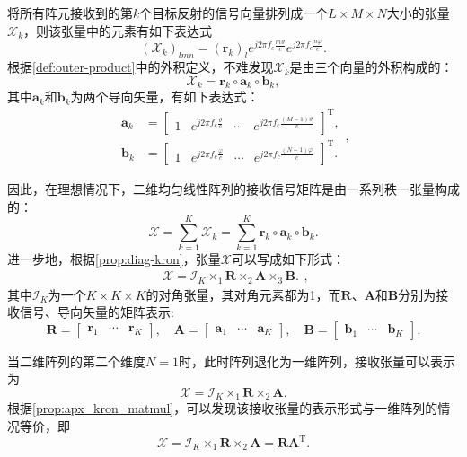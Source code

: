 将所有阵元接收到的第\( k \)个目标反射的信号向量排列成一个\( L \times M \times N \)大小的张量\( \mathcal{X}_k \)，则该张量中的元素有如下表达式
\[
    \left( \mathcal{X}_k \right)_{lmn} = \left( \bm{r}_k \right)_l e^{j 2 \pi f_c \frac{m \vartheta}{c}} e^{j 2 \pi f_c \frac{n \varphi}{c}}.
\]
根据\cref{def:outer-product}中的外积定义，不难发现\( \mathcal{X}_k \)是由三个向量的外积构成的：
\[
    \mathcal{X}_k = \bm{r}_k \circ \bm{a}_k \circ \bm{b}_k,
\]
其中\( \bm{a}_k \)和\( \bm{b}_k \)为两个导向矢量，有如下表达式：
\[
    \begin{split}
        \bm{a}_k & = \begin{bmatrix}
                         1 & e^{j 2 \pi f_c \frac{\vartheta}{c}} & \cdots & e^{j 2 \pi f_c \frac{(M-1) \vartheta}{c}}
                     \end{bmatrix}^{\mathrm{T}}, \\
        \bm{b}_k & = \begin{bmatrix}
                         1 & e^{j 2 \pi f_c \frac{\varphi}{c}} & \cdots & e^{j 2 \pi f_c \frac{(N-1) \varphi}{c}}
                     \end{bmatrix}^{\mathrm{T}}.
    \end{split},
\]

因此，在理想情况下，二维均匀线性阵列的接收信号矩阵是由一系列秩一张量构成的：
\[
    \mathcal{X}
    = \sum_{k=1}^{K} \mathcal{X}_k
    = \sum_{k=1}^{K} \bm{r}_k \circ \bm{a}_k \circ \bm{b}_k.
\]
进一步地，根据\cref{prop:diag-kron}，张量\( \mathcal{X} \)可以写成如下形式：
\[
    \begin{split}
        \mathcal{X} = \mathcal{I}_K \times_1 \mathbf{R} \times_2 \mathbf{A} \times_3 \mathbf{B}.
    \end{split},
\]
其中\( \mathcal{I}_K \)为一个\( K \times K \times K \)的对角张量，其对角元素都为1，而\( \mathbf{R} \)、\( \mathbf{A} \)和\( \mathbf{B} \)分别为接收信号、导向矢量的矩阵表示:
\[
    \mathbf{R} = \begin{bmatrix}
        \bm{r}_1 & \cdots & \bm{r}_K
    \end{bmatrix}, \quad
    \mathbf{A} = \begin{bmatrix}
        \bm{a}_1 & \cdots & \bm{a}_K
    \end{bmatrix}, \quad
    \mathbf{B} = \begin{bmatrix}
        \bm{b}_1 & \cdots & \bm{b}_K
    \end{bmatrix}.
\]

当二维阵列的第二个维度\( N=1 \)时，此时阵列退化为一维阵列，接收张量可以表示为
\[
    \mathcal{X} = \mathcal{I}_K \times_1 \mathbf{R} \times_2 \mathbf{A}.
\]
根据\cref{prop:apx_kron_matmul}，可以发现该接收张量的表示形式与一维阵列的情况等价，即
\[
    \mathcal{X} = \mathcal{I}_K \times_1 \mathbf{R} \times_2 \mathbf{A} = \mathbf{R} \mathbf{A}^{\mathrm{T}}.
\]

